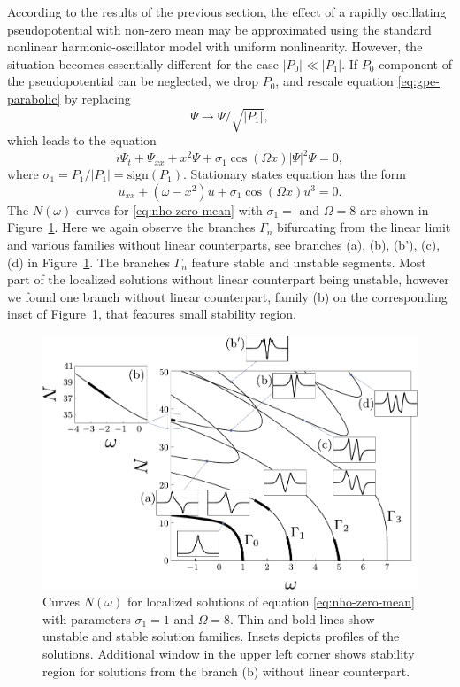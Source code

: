 According to the results of the previous section, the effect of a rapidly oscillating pseudopotential with non-zero mean may be approximated using the standard nonlinear harmonic-oscillator model with uniform nonlinearity.
However, the situation becomes essentially different for the case $|P_0| \ll |P_1|$.
If $P_0$ component of the pseudopotential can be neglected, we drop $P_0$, and rescale equation \eqref{eq:gpe-parabolic} by replacing
\begin{equation}
	\Psi \to \Psi / \sqrt{|P_1|},
\end{equation}
which leads to the equation
\begin{equation}
	i \Psi_t + \Psi_{xx} + x^2 \Psi + \sigma_1 \cos (\Omega x) |\Psi|^2 \Psi = 0,
\label{eq:gpe-zero-mean}
\end{equation}
where $\sigma_1 = P_1 / |P_1| = \mathrm{sign}(P_1)$.
Stationary states equation has the form
\begin{equation}
	u_{xx} + (\omega - x^2) u + \sigma_1 \cos (\Omega x) u^3 = 0.
\label{eq:nho-zero-mean}
\end{equation}
The $N(\omega)$ curves for \eqref{eq:nho-zero-mean} with $\sigma_1 = $ and $\Omega = 8$ are shown in Figure~\ref{fig:stability-nho-zero-mean}.
Here we again observe the branches $\Gamma_n$ bifurcating from the linear limit and various families without linear counterparts, see branches (a), (b), (b'), (c), (d) in Figure~\ref{fig:stability-nho-zero-mean}.
The branches $\Gamma_n$ feature stable and unstable segments.
Most part of the localized solutions without linear counterpart being unstable, however we found one branch  without linear counterpart, family (b) on the corresponding inset of Figure~\ref{fig:stability-nho-zero-mean}, that features small stability region.

\begin{figure}[h]
\centering
	\includegraphics[scale = 1]{pic/branches for cosine nho, zero mean}
	\caption{
		Curves $N(\omega)$ for localized solutions of equation \eqref{eq:nho-zero-mean} with parameters $\sigma_1 = 1$ and $\Omega = 8$.
		Thin and bold lines show unstable and stable solution families.
		Insets depicts profiles of the solutions.
		Additional window in the upper left corner shows stability region for solutions from the branch (b) without linear counterpart.
	}
\label{fig:stability-nho-zero-mean}
\end{figure}

